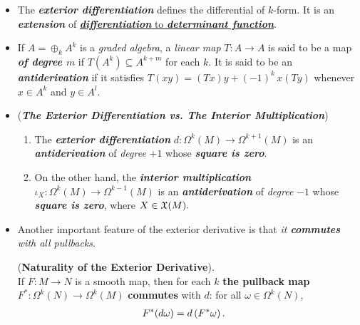 \documentclass[11pt]{article}
\begin{document}
\begin{itemize}
\item \begin{remark}
The \emph{\textbf{exterior differentiation}} defines the differential of $k$-form. It is an \textbf{\emph{extension}} of \underline{\emph{\textbf{differentiation}} to \emph{\textbf{determinant function}}}.
\end{remark}


\item \begin{definition}
If $A =  \oplus_{k} A^k$ is a \emph{graded algebra}, a \emph{linear map} $T: A \rightarrow A$ is said to be a map \emph{\textbf{of degree $m$}} if $T(A^k) \subseteq A^{k+m}$ for each $k$. It is said to be an \emph{\textbf{antiderivation}} if it satisfies $T(xy) = (Tx)y + (-1)^k\, x(Ty)$ whenever $x\in A^k$ and $y \in A^l$. 
\end{definition}

\item \begin{remark} (\emph{\textbf{The Exterior Differentiation vs. The Interior Multiplication}})
\begin{enumerate}
\item The \emph{\textbf{exterior differentiation}} $d: \Omega^k(M) \rightarrow \Omega^{k+1}(M)$ is an  \emph{\textbf{antiderivation}} of \emph{degree} $+1$ whose \emph{\textbf{square is zero}}.
\item On the other hand, the \emph{\textbf{interior multiplication}} $\iota_{X}: \Omega^k(M) \rightarrow \Omega^{k-1}(M)$ is an \emph{\textbf{antiderivation}} of \emph{degree} $-1$ whose \emph{\textbf{square is zero}}, where $X \in {\mathfrak X}(M).$
\end{enumerate}
\end{remark}

\item Another important feature of the exterior derivative is that \emph{it \textbf{commutes} with all pullbacks}.
\begin{proposition} (\textbf{Naturality of the Exterior Derivative}). \\
If $F: M \rightarrow N$ is a smooth map, then for each $k$ \textbf{the pullback map} $F^{*}: \Omega^k(N) \rightarrow \Omega^k(M)$ \textbf{commutes}
with $d$: for all $\omega \in \Omega^{k}(N)$,
\begin{align}
F^{*}(d\omega) &= d\left(F^{*}\omega\right).  \label{eqn: exterior_derivatives_pullback_commute_2}
\end{align}
\end{proposition}
\end{itemize}
\end{document}
